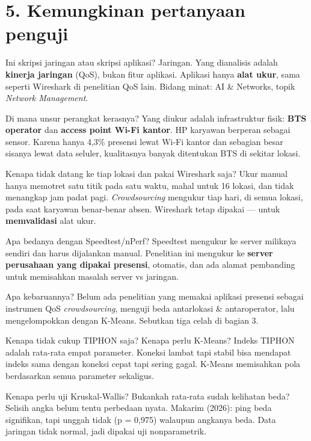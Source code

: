 \section*{5. Kemungkinan pertanyaan penguji}
\setcounter{tanya}{0}
\begin{tanya}{Ini skripsi jaringan atau skripsi aplikasi?}
Jaringan. Yang dianalisis adalah \textbf{kinerja jaringan} (QoS), bukan fitur aplikasi. Aplikasi hanya \textbf{alat ukur}, sama seperti Wireshark di penelitian QoS lain. Bidang minat: AI \& Networks, topik \textit{Network Management}.
\end{tanya}
\begin{tanya}{Di mana unsur perangkat kerasnya?}
Yang diukur adalah infrastruktur fisik: \textbf{BTS operator} dan \textbf{access point Wi-Fi kantor}. HP karyawan berperan sebagai sensor. Karena hanya 4,3\% presensi lewat Wi-Fi kantor dan sebagian besar sisanya lewat data seluler, kualitasnya banyak ditentukan BTS di sekitar lokasi.
\end{tanya}
\begin{tanya}{Kenapa tidak datang ke tiap lokasi dan pakai Wireshark saja?}
Ukur manual hanya memotret satu titik pada satu waktu, mahal untuk 16 lokasi, dan tidak menangkap jam padat pagi. \textit{Crowdsourcing} mengukur tiap hari, di semua lokasi, pada saat karyawan benar-benar absen. Wireshark tetap dipakai --- untuk \textbf{memvalidasi} alat ukur.
\end{tanya}
\begin{tanya}{Apa bedanya dengan Speedtest/nPerf?}
Speedtest mengukur ke server miliknya sendiri dan harus dijalankan manual. Penelitian ini mengukur ke \textbf{server perusahaan yang dipakai presensi}, otomatis, dan ada alamat pembanding untuk memisahkan masalah server vs jaringan.
\end{tanya}
\begin{tanya}{Apa kebaruannya?}
Belum ada penelitian yang memakai aplikasi presensi sebagai instrumen QoS \textit{crowdsourcing}, menguji beda antarlokasi \& antaroperator, lalu mengelompokkan dengan K-Means. Sebutkan tiga celah di bagian 3.
\end{tanya}
\begin{tanya}{Kenapa tidak cukup TIPHON saja? Kenapa perlu K-Means?}
Indeks TIPHON adalah rata-rata empat parameter. Koneksi lambat tapi stabil bisa mendapat indeks sama dengan koneksi cepat tapi sering gagal. K-Means memisahkan pola berdasarkan semua parameter sekaligus.
\end{tanya}
\begin{tanya}{Kenapa perlu uji Kruskal-Wallis? Bukankah rata-rata sudah kelihatan beda?}
Selisih angka belum tentu perbedaan nyata. Makarim (2026): ping beda signifikan, tapi unggah tidak (p = 0,975) walaupun angkanya beda. Data jaringan tidak normal, jadi dipakai uji nonparametrik.
\end{tanya}
